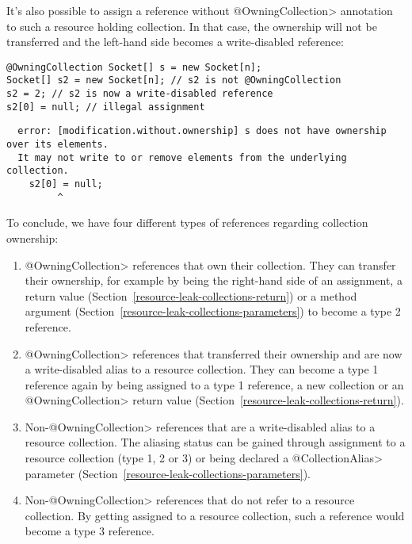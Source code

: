 It's also possible to assign a reference without \<@OwningCollection> annotation to such a resource holding collection. In that case, the ownership will not be transferred and the left-hand side becomes a write-disabled reference:

\begin{Verbatim}
@OwningCollection Socket[] s = new Socket[n];
Socket[] s2 = new Socket[n]; // s2 is not @OwningCollection
s2 = 2; // s2 is now a write-disabled reference
s2[0] = null; // illegal assignment
\end{Verbatim}

\begin{Verbatim}
  error: [modification.without.ownership] s does not have ownership over its elements.
  It may not write to or remove elements from the underlying collection.
    s2[0] = null;
         ^
\end{Verbatim}

To conclude, we have four different types of references regarding collection ownership:
\begin{enumerate}
  \item \<@OwningCollection> references that own their collection. They can transfer their ownership, for example by being the right-hand side of an assignment, a return value (Section~\ref{resource-leak-collections-return}) or a method argument (Section~\ref{resource-leak-collections-parameters}) to become a type 2 reference.
  \item \<@OwningCollection> references that transferred their ownership and are now a write-disabled alias to a resource collection. They can become a type 1 reference again by being assigned to a type 1 reference, a new collection or an \<@OwningCollection> return value (Section~\ref{resource-leak-collections-return}).
  \item Non-\<@OwningCollection> references that are a write-disabled alias to a resource collection. The aliasing status can be gained through assignment to a resource collection (type 1, 2 or 3) or being declared a \<@CollectionAlias> parameter (Section~\ref{resource-leak-collections-parameters}).
  \item Non-\<@OwningCollection> references that do not refer to a resource collection. By getting assigned to a resource collection, such a reference would become a type 3 reference.
\end{enumerate}

